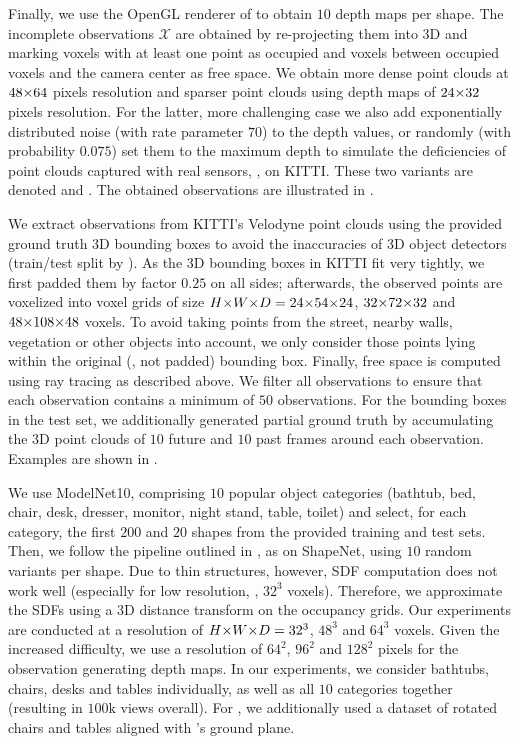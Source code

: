 Finally, we use the OpenGL renderer of \cite{Guney2015CVPR} to obtain $10$ depth maps per shape. The incomplete observations $\mathcal{X}$ are obtained by re-projecting them into 3D and marking voxels with at least one point as occupied and voxels between occupied voxels and the camera center as free space. We obtain more dense point clouds at $48 \operatorname*{\!\times\!} 64$ pixels resolution and sparser point clouds using depth maps of $24 \operatorname*{\!\times\!} 32$ pixels resolution. For the latter, more challenging case we also add exponentially distributed noise (with rate parameter $70$) to the depth values, or randomly (with probability $0.075$) set them to the maximum depth to simulate the deficiencies of point clouds captured with real sensors, \eg, on KITTI. These two variants are denoted {\bf\clean} and {\bf\noisy}.
The obtained observations are illustrated in .

%
We extract observations from KITTI's Velodyne point clouds using the provided ground truth 3D bounding boxes to avoid the inaccuracies of 3D object detectors (train/test split by \cite{Chen2016ARXIV}). As the 3D bounding boxes in KITTI fit very tightly, we first padded them by factor $0.25$ on all sides; afterwards, the observed points are voxelized into voxel grids of size $H \ntimes W \ntimes D = 24 \ntimes 54 \ntimes 24$, $32 \operatorname*{\!\times\!} 72 \operatorname*{\!\times\!} 32$ and $48 \operatorname*{\!\times\!} 108 \operatorname*{\!\times\!} 48$ voxels. To avoid taking points from the street, nearby walls, vegetation or other objects into account, we only consider those points lying within the original (\ie, not padded) bounding box. Finally, free space is computed using ray tracing as described above. We filter all observations to ensure that each observation contains a minimum of $50$ observations. For the bounding boxes in the test set, we additionally generated partial ground truth by accumulating the 3D point clouds of $10$ future and $10$ past frames around each observation. Examples are shown in .

%
We use ModelNet10, comprising $10$ popular object categories (bathtub, bed, chair, desk, dresser, monitor, night stand, table, toilet) and select, for each category, the first $200$ and $20$ shapes from the provided training and test sets. Then, we follow the pipeline outlined in , as on ShapeNet, using $10$ random variants per shape. Due to thin structures, however, SDF computation does not work well (especially for low resolution, \eg, $32^3$ voxels). Therefore, we approximate the SDFs using a 3D distance transform on the occupancy grids. Our experiments are conducted at a resolution of $H \operatorname*{\!\times\!} W \operatorname*{\!\times\!} D = 32^3$, $48^3$ and $64^3$ voxels. Given the increased difficulty, we use a resolution of $64^2$, $96^2$ and $128^2$ pixels for the observation generating depth maps. In our experiments, we consider bathtubs, chairs, desks and tables individually, as well as all $10$ categories together (resulting in $100\text{k}$ views overall). For \Kinect, we additionally used a dataset of rotated chairs and tables aligned with \Kinect's ground plane.

